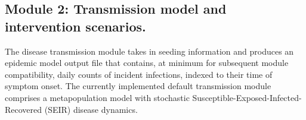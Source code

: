 \subsection{Module 2: Transmission model and intervention scenarios.}
The disease transmission module takes in seeding information and produces an epidemic model output file that contains, at minimum for subsequent module compatibility, daily counts of incident infections, indexed to their time of symptom onset. The currently implemented default transmission module comprises a metapopulation model with stochastic Susceptible-Exposed-Infected-Recovered (SEIR) disease dynamics.

